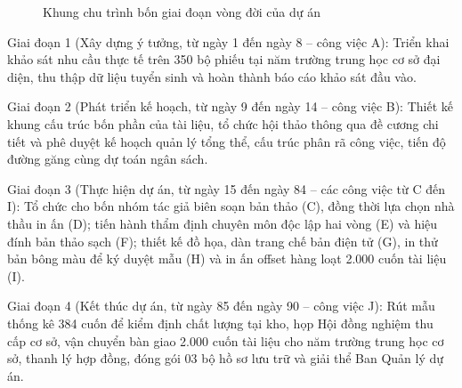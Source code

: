 \begin{figure}[htbp]
\centering
\caption{Khung chu trình bốn giai đoạn vòng đời của dự án}
\label{fig:chu_trinh_vong_doi}
\end{figure}

Giai đoạn 1 (Xây dựng ý tưởng, từ ngày 1 đến ngày 8 -- công việc A): Triển khai khảo sát nhu cầu thực tế trên 350 bộ phiếu tại năm trường trung học cơ sở đại diện, thu thập dữ liệu tuyển sinh và hoàn thành báo cáo khảo sát đầu vào.

Giai đoạn 2 (Phát triển kế hoạch, từ ngày 9 đến ngày 14 -- công việc B): Thiết kế khung cấu trúc bốn phần của tài liệu, tổ chức hội thảo thông qua đề cương chi tiết và phê duyệt kế hoạch quản lý tổng thể, cấu trúc phân rã công việc, tiến độ đường găng cùng dự toán ngân sách.

Giai đoạn 3 (Thực hiện dự án, từ ngày 15 đến ngày 84 -- các công việc từ C đến I): Tổ chức cho bốn nhóm tác giả biên soạn bản thảo (C), đồng thời lựa chọn nhà thầu in ấn (D); tiến hành thẩm định chuyên môn độc lập hai vòng (E) và hiệu đính bản thảo sạch (F); thiết kế đồ họa, dàn trang chế bản điện tử (G), in thử bản bông màu để ký duyệt mẫu (H) và in ấn offset hàng loạt 2.000 cuốn tài liệu (I).

Giai đoạn 4 (Kết thúc dự án, từ ngày 85 đến ngày 90 -- công việc J): Rút mẫu thống kê 384 cuốn để kiểm định chất lượng tại kho, họp Hội đồng nghiệm thu cấp cơ sở, vận chuyển bàn giao 2.000 cuốn tài liệu cho năm trường trung học cơ sở, thanh lý hợp đồng, đóng gói 03 bộ hồ sơ lưu trữ và giải thể Ban Quản lý dự án.

